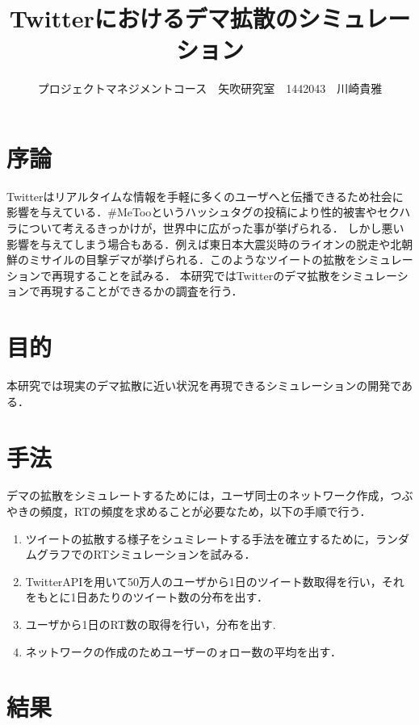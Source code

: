 \documentclass[uplatex,twocolumn,dvipdfmx]{jsarticle}
\title{\vspace{-5mm}\fontsize{14pt}{0pt}\selectfont Twitterにおけるデマ拡散のシミュレーション}
\author{\normalsize プロジェクトマネジメントコース　矢吹研究室　1442043　川崎貴雅}
\date{}
\begin{document}
\fontsize{10.5pt}{\baselineskip}\selectfont
\maketitle



\section{序論}\label{序論}

Twitterはリアルタイムな情報を手軽に多くのユーザへと伝播できるため社会に影響を与えている．\#MeTooというハッシュタグの投稿により性的被害やセクハラについて考えるきっかけが，世界中に広がった事が挙げられる．
しかし悪い影響を与えてしまう場合もある．例えば東日本大震災時のライオンの脱走や北朝鮮のミサイルの目撃デマが挙げられる．このようなツイートの拡散をシミュレーションで再現することを試みる．
本研究ではTwitterのデマ拡散をシミュレーションで再現することができるかの調査を行う．

\section{目的}

本研究では現実のデマ拡散に近い状況を再現できるシミュレーションの開発である．

\section{手法}

デマの拡散をシミュレートするためには，ユーザ同士のネットワーク作成，つぶやきの頻度，RTの頻度を求めることが必要なため，以下の手順で行う．
\begin{enumerate}
\item ツイートの拡散する様子をシュミレートする手法を確立するために，ランダムグラフでのRTシミュレーションを試みる\cite{netto}．
\item TwitterAPIを用いて50万人のユーザから1日のツイート数取得を行い，それをもとに1日あたりのツイート数の分布を出す．
\item ユーザから1日のRT数の取得を行い，分布を出す.
\item ネットワークの作成のためユーザーのォロー数の平均を出す．
\end{enumerate}

\section{結果}
\end{document}
